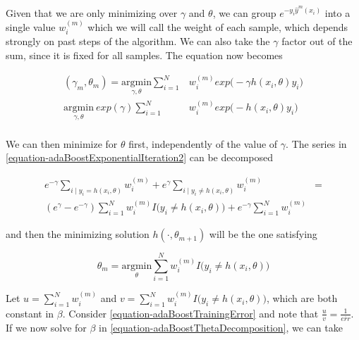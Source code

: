 \documentclass{article}%
\theoremstyle{definition}
\begin{document}
Given that we are only minimizing over $\gamma$ and $\theta$, we can group $e^{-y_i  \hat{y}^{m}(x_i)}$ into a single value $w_i^{(m)}$ which we will call the weight of each sample, which depends strongly on past steps of the algorithm. We can also take the $\gamma$ factor out of the sum, since it is fixed for all samples. The equation now becomes

\begin{equation} \label{equation-adaBoostExponentialIteration2}
\begin{split}
(\gamma_{m}, \theta_{m}) = \underset{\gamma, \theta}{\mathrm{argmin}}  \sum_{i=1}^{N} &  w_i^{(m)} exp \big(- \gamma h(x_i,\theta)y_i \big) \\
 \underset{\gamma, \theta}{\mathrm{argmin}} \  exp(\gamma) \sum_{i=1}^{N} & w_i^{(m)} exp \big( - h(x_i,\theta)y_i \big) \\
\end{split}
\end{equation}

We can then minimize for $\theta$ first, independently of the value of $\gamma$. The series in \ref{equation-adaBoostExponentialIteration2} can be decomposed 

\begin{equation} \label{equation-adaBoostThetaDecomposition}
\begin{split}
e^{-\gamma} \sum_{i \mid y_i = h(x_i,\theta)} w_i^{(m)}  + e^{\gamma} \sum_{i \mid y_i \neq h(x_i,\theta)} w_i^{(m)} & = \\
( e^{\gamma} - e^{-\gamma}) \sum_{i = 1}^{N} w_i^{(m)} I \big( y_i \neq h(x_i,\theta)   \big)  + e^{-\gamma} \sum_{i = 1}^{N}   w_i^{(m)} &
\end{split}
\end{equation}


and then the minimizing solution $h(\cdot, \theta_{m+1})$ will be the one satisfying

 \begin{equation} \label{equation-adaBoostThetaMinimization}
  \theta_{m} = \underset{ \theta}{\mathrm{argmin}}  \sum_{i=1}^{N}  w_i^{(m)} I \big( y_i \neq h(x_i,\theta)   \big) 
 \end{equation}

Let $u = \sum_{i=1}^{N}  w_i^{(m)}$ and $v = \sum_{i=1}^{N}  w_i^{(m)} I \big( y_i \neq h(x_i,\theta)   \big) $, which are both constant in $\beta$. Consider \ref{equation-adaBoostTrainingError} and note that $\frac{u}{v} = \frac{1}{\overline{err}}$. If we now solve for $\beta$ in \ref{equation-adaBoostThetaDecomposition}, we can take
\end{document}
